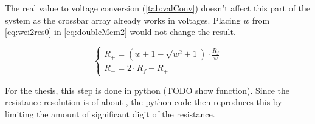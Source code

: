 The real value to voltage conversion (\cref{tab:valConv}) doesn't affect this part of the system as the crossbar array already works in voltages. Placing $w$ from \cref{eq:wei2res0} in \cref{eq:doubleMem2} would not change the result.

\begin{equation}
  \label{eq:wei2res2}
  \begin{cases}
    R_+= (w+1-\sqrt{w^2+1})\cdot\frac{R_f}{w}\\
    R_-=2\cdot R_f -R_+
  \end{cases}
\end{equation}

For the thesis, this step is done in python (TODO show function). Since the resistance resolution is of about%
, the python code then reproduces this by limiting the amount of significant digit of the resistance.
